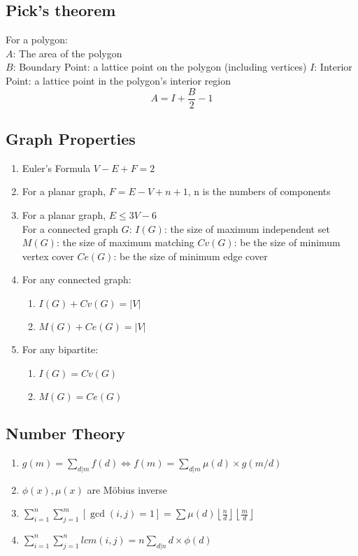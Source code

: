 \subsection{Pick's theorem}
For a polygon: \\
$A$: The area of the polygon \\
$B$: Boundary Point: a lattice point on the polygon (including vertices)
$I$: Interior Point: a lattice point in the polygon’s interior region
$$A= I + \frac{B}{2} - 1$$

\subsection{Graph Properties}
\begin{enumerate}\itemsep = -5pt
\item Euler's Formula $V-E+F=2$
\item For a planar graph, $F=E-V+n+1$, n is the numbers of components
\item For a planar graph, $E\leq 3V-6$ \\

For a connected graph $G$:
$I(G)$: the size of maximum independent set
$M(G)$: the size of maximum matching
$Cv(G)$: be the size of minimum vertex cover
$Ce(G)$: be the size of minimum edge cover
\item For any connected graph:
  \begin{enumerate}\itemsep = -3pt
  \item $I(G)+Cv(G)=|V|$
  \item $M(G)+Ce(G)=|V|$
  \end{enumerate}
\item For any bipartite:
  \begin{enumerate}\itemsep = -3pt
  \item $I(G)=Cv(G)$
  \item $M(G)=Ce(G)$
   \end{enumerate}
\end{enumerate}



\subsection{Number Theory}
\begin{enumerate}\itemsep = -3pt
  \item $g(m)=\sum_{d|m}f(d)\Leftrightarrow f(m)=\sum_{d|m}\mu (d) \times g(m/d)$
  \item $\phi(x), \mu(x)$ are Möbius inverse
  \item $\sum_{i=1}^n\sum_{j=1}^m [\gcd(i, j) = 1]=\sum \mu(d)\left \lfloor \frac{n}{d} \right \rfloor \left \lfloor \frac{m}{d} \right \rfloor$
  \item $\sum_{i=1}^n\sum_{j=1}^nlcm(i,j)=n\sum_{d|n} d \times \phi (d)$
\end{enumerate}

